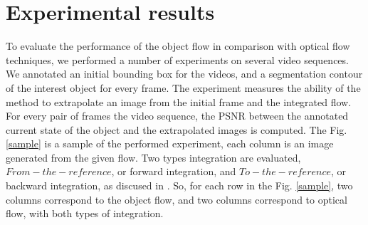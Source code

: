 \section{Experimental results}
To evaluate the performance of the object flow in comparison with optical flow techniques, we performed 
a number of experiments on several video sequences. We annotated an initial bounding box for the videos, 
and a segmentation contour of the interest object for every frame. The experiment measures the ability of the method to 
extrapolate an image from the initial frame and the integrated flow. For every pair of frames the video sequence, the PSNR between the annotated
current state of the object and the extrapolated images is computed. The Fig. \ref{sample} is a sample of the performed experiment, each column is an image generated from the given flow. 
Two types integration are evaluated, $From-the-reference$, or forward integration, and $To-the-reference$, or backward integration, as discused in \cite{c20}. So, for each row in the Fig. \ref{sample}, two columns correspond to the object flow, and two columns correspond to optical flow, with both types of integration.

